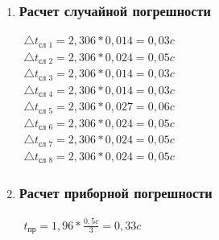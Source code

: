 \begin{enumerate}
		\item \subsubsection*{Расчет случайной погрешности}
		\label{appendix: 3}
		\begin{multicols}{2}
			\(\begin{aligned}\triangle t_{\text{сл 1}} = 2,306 * 0,014 = 0,03 c\end{aligned}\) \\
			\(\begin{aligned}\triangle t_{\text{сл 2}} = 2,306 * 0,024 = 0,05 c\end{aligned}\) \\
			\(\begin{aligned}\triangle t_{\text{сл 3}} = 2,306 * 0,014 = 0,03 c\end{aligned}\) \\  
			\(\begin{aligned}\triangle t_{\text{сл 4}} = 2,306 * 0,014 = 0,03 c\end{aligned}\) \\
			\vfil
			\(\begin{aligned}\triangle t_{\text{сл 5}} = 2,306 * 0,027 = 0,06 c\end{aligned}\) \\ 
			\(\begin{aligned}\triangle t_{\text{сл 6}} = 2,306 * 0,024 = 0,05 c\end{aligned}\) \\ 
			\(\begin{aligned}\triangle t_{\text{сл 7}} = 2,306 * 0,024 = 0,05 c\end{aligned}\) \\
			\(\begin{aligned}\triangle t_{\text{сл 8}} = 2,306 * 0,024 = 0,05 c\end{aligned}\) \\ 
		\end{multicols}
		
		\item \subsubsection*{Расчет приборной погрешности}
		\label{appendix: 4}
		\(\begin{aligned}
			t_{\text{пр}} = 1,96 * \frac{0,5 c}{3} = 0,33 c
		\end{aligned}\)
		

\end{enumerate}
